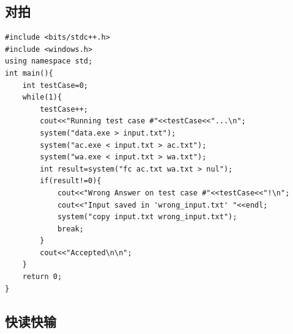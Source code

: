 \documentclass[11pt,a4paper]{ctexart}
\begin{document}
\subsection{对拍}

\begin{lstlisting}
#include <bits/stdc++.h>
#include <windows.h>
using namespace std;
int main(){
    int testCase=0;
    while(1){
        testCase++;
        cout<<"Running test case #"<<testCase<<"...\n";
        system("data.exe > input.txt");
        system("ac.exe < input.txt > ac.txt");
        system("wa.exe < input.txt > wa.txt");
        int result=system("fc ac.txt wa.txt > nul");
        if(result!=0){
            cout<<"Wrong Answer on test case #"<<testCase<<"!\n";
            cout<<"Input saved in 'wrong_input.txt' "<<endl;
            system("copy input.txt wrong_input.txt");
            break;
        }
        cout<<"Accepted\n\n";
    }
    return 0;
}
\end{lstlisting}

\subsection{快读快输}
\end{document}
